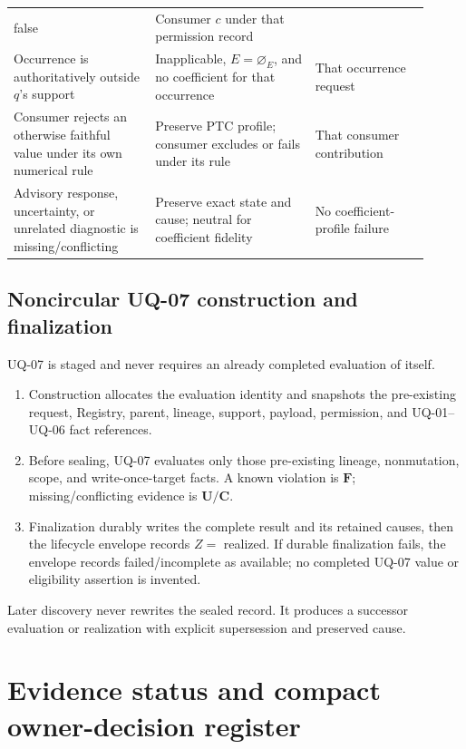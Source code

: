 \begin{longtable}{p{0.31\linewidth}p{0.35\linewidth}p{0.25\linewidth}}
false & Consumer \(c\) under that permission record\\
Occurrence is authoritatively outside \(q\)'s support & Inapplicable,
\(E=\varnothing_E\), and no coefficient for that occurrence & That occurrence
request\\
Consumer rejects an otherwise faithful value under its own numerical rule &
Preserve PTC profile; consumer excludes or fails under its rule & That
consumer contribution\\
Advisory response, uncertainty, or unrelated diagnostic is missing/conflicting
& Preserve exact state and cause; neutral for coefficient fidelity & No
coefficient-profile failure\\
\bottomrule
\end{longtable}

\subsection{Noncircular UQ-07 construction and finalization}

UQ-07 is staged and never requires an already completed evaluation of itself.

\begin{enumerate}
\item Construction allocates the evaluation identity and snapshots the
pre-existing request, Registry, parent, lineage, support, payload, permission,
and UQ-01--UQ-06 fact references.
\item Before sealing, UQ-07 evaluates only those pre-existing lineage,
nonmutation, scope, and write-once-target facts. A known violation is
\(\mathbf F\); missing/conflicting evidence is \(\mathbf U/\mathbf C\).
\item Finalization durably writes the complete result and its retained causes,
then the lifecycle envelope records \(Z=\) realized. If durable finalization
fails, the envelope records failed/incomplete as available; no completed
UQ-07 value or eligibility assertion is invented.
\end{enumerate}

Later discovery never rewrites the sealed record. It produces a successor
evaluation or realization with explicit supersession and preserved cause.

\section{Evidence status and compact owner-decision register}

